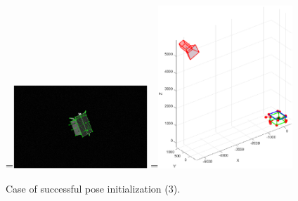 \begin{figure}[htpb]
  =\hbox{\includegraphics[width=0.45\textwidth]{gfx/PoseDetermination/trial212modelMap.eps}}%
  =\hbox{\includegraphics[width=0.45\textwidth]{gfx/PoseDetermination/cameraWRTSC212.eps}}%
  {\,} \hfill
   \hfill
   \hfill
  {\,}
  \caption{Case of successful pose initialization (3).}
  \label{fig:EVVAI3}
\end{figure}

